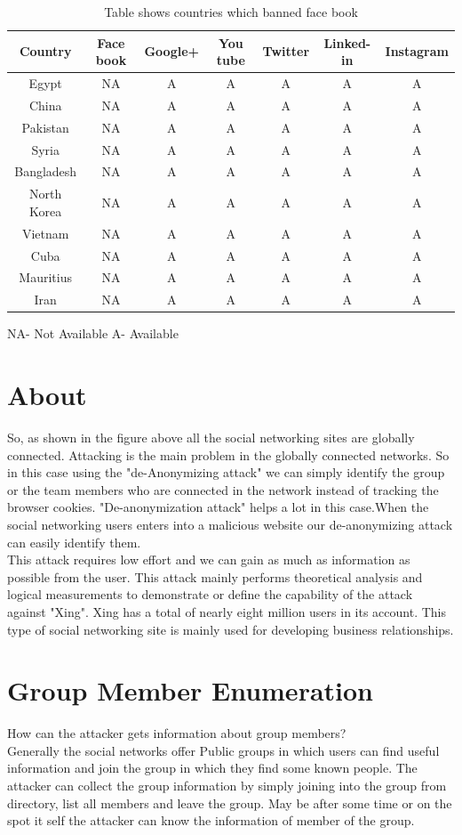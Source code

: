 \documentclass[14pt letter paper]{article}
\begin{document}
\begin{table}
 \begin{tabular}{||c c c c c c c||} 
 \hline
 Country & Face book & Google+ & You tube & Twitter & Linked-in & Instagram \\ [7ex] 
 \hline
 Egypt & NA & A & A & A & A & A \\ 
 \hline
 China & NA & A & A & A & A & A \\
 \hline
 Pakistan & NA & A & A & A & A & A \\
 \hline
 Syria & NA & A & A & A & A & A  \\
 \hline
 Bangladesh & NA & A & A & A & A & A \\
 \hline
 North Korea & NA & A & A & A & A & A \\
 \hline
 Vietnam & NA & A & A & A & A & A \\
 \hline
 Cuba & NA & A & A & A & A & A \\
 \hline
 Mauritius & NA & A & A & A & A & A \\ 
 \hline
 Iran & NA & A & A & A & A & A \\ [5ex] 
 \hline
\end{tabular}
\caption{Table shows countries which banned face book}   NA- Not Available \hspace{2cm} A-  Available
\label{table:1}
\end{table}

\section{About}
So, as shown in the figure above all the social networking sites are globally connected. Attacking is the main problem in the globally connected networks. So in this case using the "de-Anonymizing attack" we can simply identify the group or the team members who are connected in the network instead of tracking the browser cookies. "De-anonymization attack" helps a lot in this case.When the social networking users enters into a malicious website our de-anonymizing attack can easily identify them. 
 \\ This attack requires low effort and we can gain as much as information as possible from the user. This attack mainly performs theoretical analysis and logical measurements to demonstrate or define the capability of the attack against "Xing". Xing has a total of nearly eight million users in its account. This type of social networking site is mainly used for developing business relationships.

 \section{Group Member Enumeration}
 How can the attacker gets information about group members?
 \\Generally the social networks offer Public groups in which users can find useful information and join the group in which they find some known people. The attacker can collect the group information by simply joining into the group from directory, list all members and leave the group. May be after some time or on the spot it self the attacker can know the information of member of the group.
 
\end{document}
